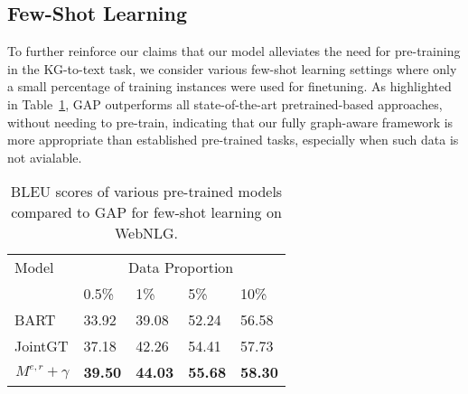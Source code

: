 \documentclass[11pt]{article}
\begin{document}
\subsection{Few-Shot Learning}
To further reinforce our claims that our model alleviates the need for pre-training in the KG-to-text task, we consider various few-shot learning settings where only a small percentage of training instances were used for finetuning. As highlighted in Table~\ref{tab:few-shot}, GAP outperforms all state-of-the-art pretrained-based approaches, without needing to pre-train, indicating that our fully graph-aware framework is more appropriate than established pre-trained tasks, especially when such data is not avialable.

\begin{table}[]
\centering
\begin{tabular}{l|llll}
\hline
Model                 & \multicolumn{4}{c}{Data Proportion} \\ \cline{2-5} 
                      & 0.5\%   & 1\%     & 5\%    & 10\%   \\ \hline
BART                  & 33.92   & 39.08   & 52.24  & 56.58  \\
JointGT & 37.18   & 42.26   & 54.41  & 57.73  \\ \hline
\textbf{$ {}^{}_{}M^{e,r}+\gamma$} & \textbf{39.50} & \textbf{44.03} & \textbf{55.68} & \textbf{58.30} \\ \hline
\end{tabular}\caption{\label{tab:few-shot}BLEU scores of various pre-trained models compared to GAP for few-shot learning on WebNLG.}

\end{table}
\end{document}
